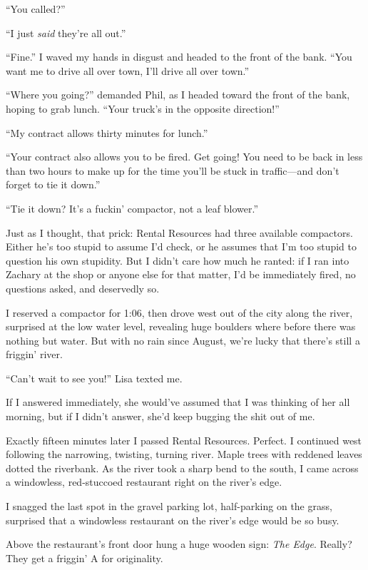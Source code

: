 ``You called?''

``I just \emph{said} they're all out.''

``Fine.'' I waved my hands in disgust and headed to the front of the
bank. ``You want me to drive all over town, I'll drive all over town.''

``Where you going?'' demanded Phil, as I headed toward the front of the
bank, hoping to grab lunch. ``Your truck's in the opposite direction!''

``My contract allows thirty minutes for lunch.''

``Your contract also allows you to be fired. Get going! You need to be
back in less than two hours to make up for the time you'll be stuck in
traffic---and don't forget to tie it down.''

``Tie it down? It's a fuckin' compactor, not a leaf blower.''

Just as I thought, that prick: Rental Resources had three available
compactors. Either he's too stupid to assume I'd check, or he assumes
that I'm too stupid to question his own stupidity. But I didn't care how
much he ranted: if I ran into Zachary at the shop or anyone else for
that matter, I'd be immediately fired, no questions asked, and
deservedly so.

I reserved a compactor for 1:06, then drove west out of the city along
the river, surprised at the low water level, revealing huge boulders
where before there was nothing but water. But with no rain since August,
we're lucky that there's still a friggin' river.

``Can't wait to see you!'' Lisa texted me.

If I answered immediately, she would've assumed that I was thinking of
her all morning, but if I didn't answer, she'd keep bugging the shit out
of me.

Exactly fifteen minutes later I passed Rental Resources. Perfect. I
continued west following the narrowing, twisting, turning river. Maple
trees with reddened leaves dotted the riverbank. As the river took a
sharp bend to the south, I came across a windowless, red-stuccoed
restaurant right on the river's edge.

I snagged the last spot in the gravel parking lot, half-parking on the
grass, surprised that a windowless restaurant on the river's edge would
be so busy.

Above the restaurant's front door hung a huge wooden sign: \emph{The
Edge}. Really? They get a friggin' A for originality.

